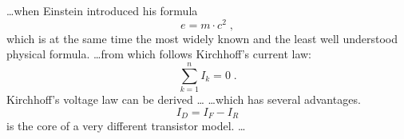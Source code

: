 \documentclass{article}
\begin{document}
\ldots when Einstein introduced his formula
\begin{equation}
    e = m \cdot c^2 \; ,
\end{equation}
which is at the same time the most widely known
and the least well understood physical formula.
\ldots from which follows Kirchhoff's current law:
\begin{equation}
    \sum_{k=1}^{n} I_k = 0 \; .
\end{equation}
Kirchhoff's voltage law can be derived \ldots
\ldots which has several advantages.
\begin{equation}
    I_D = I_F - I_R
\end{equation}
is the core of a very different transistor model. \ldots
\end{document}
